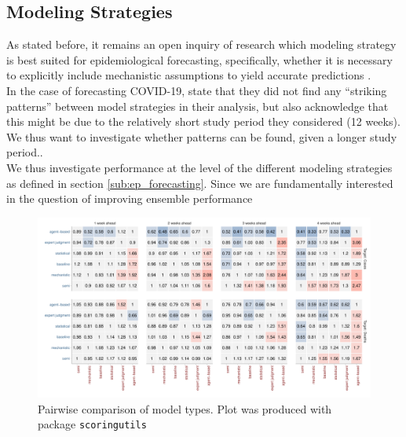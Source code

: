 \subsection{Modeling Strategies} \label{sub:model_types_analysis}
As stated before, it remains an open inquiry of research which modeling strategy is best suited for epidemiological forecasting, specifically, whether it is necessary to explicitly include mechanistic assumptions to yield accurate predictions \citep{funk_short-term_nodate}.\\ %
In the case of forecasting COVID-19, \citep{bracher_evaluating_2021} state that they did not find any ``striking patterns'' between model strategies in their analysis, but also acknowledge that this might be due to the relatively short study period they considered (12 weeks). We thus want to investigate whether patterns can be found, given a longer study period..\\
We thus investigate performance at the level of the different modeling strategies as defined in section \ref{sub:ep_forecasting}. Since we are fundamentally interested in the question of improving ensemble performance
\begin{figure}
\centering{}
\includegraphics[width = \textwidth]{../plots/pw_comp_model_type_with_other_wide.pdf}
\caption{Pairwise comparison of model types. Plot was produced with package \texttt{scoringutils}}
\label{fig:pw_comp_modeltypes}
\end{figure}
